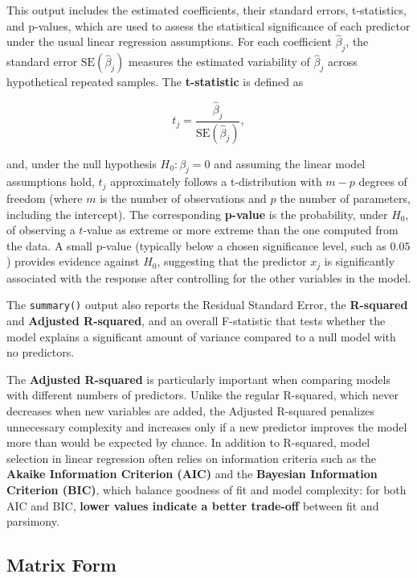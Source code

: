 This output includes the estimated coefficients, their standard errors, t-statistics, and p-values, which are used to assess the statistical significance of each predictor under the usual linear regression assumptions. For each coefficient $\hat{\beta}_j$, the standard error $\text{SE}(\hat{\beta}_j)$ measures the estimated variability of $\hat{\beta}_j$ across hypothetical repeated samples. The \textbf{t-statistic} is defined as

\[
t_j = \frac{\hat{\beta}_j}{\text{SE}(\hat{\beta}_j)},
\]

and, under the null hypothesis $H_0 : \beta_j = 0$ and assuming the linear model assumptions hold, $t_j$ approximately follows a t-distribution with $m - p$ degrees of freedom (where $m$ is the number of observations and $p$ the number of parameters, including the intercept). The corresponding \textbf{p-value} is the probability, under $H_0$, of observing a $t$-value as extreme or more extreme than the one computed from the data. A small p-value (typically below a chosen significance level, such as $0.05$) provides evidence against $H_0$, suggesting that the predictor $x_j$ is significantly associated with the response after controlling for the other variables in the model.

The \texttt{summary()} output also reports the Residual Standard Error, the \textbf{R-squared} and \textbf{Adjusted R-squared}, and an overall F-statistic that tests whether the model explains a significant amount of variance compared to a null model with no predictors.

The \textbf{Adjusted R-squared} is particularly important when comparing models with different numbers of predictors. Unlike the regular R-squared, which never decreases when new variables are added, the Adjusted R-squared penalizes unnecessary complexity and increases only if a new predictor improves the model more than would be expected by chance. In addition to R-squared, model selection in linear regression often relies on information criteria such as the \textbf{Akaike Information Criterion (AIC)} and the \textbf{Bayesian Information Criterion (BIC)}, which balance goodness of fit and model complexity: for both AIC and BIC, \textbf{lower values indicate a better trade-off} between fit and parsimony.



\subsection{Matrix Form}

